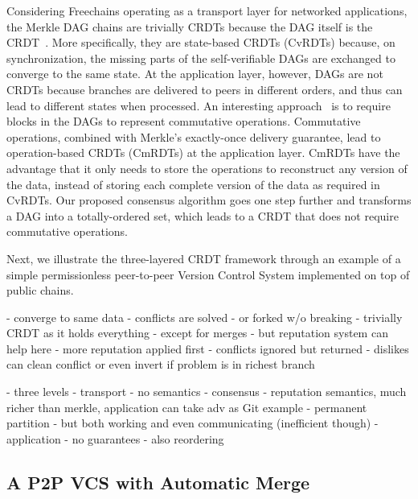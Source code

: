 \documentclass[10pt,journal,compsoc]{IEEEtran}
\newcommand{\FC}       {Freechains\xspace}
\begin{document}
Considering \FC operating as a transport layer for networked applications, the
Merkle DAG chains are trivially CRDTs because the DAG itself is the
CRDT~\cite{p2p.merkle-crdts}.
More specifically, they are state-based CRDTs (CvRDTs) because, on
synchronization, the missing parts of the self-verifiable DAGs are exchanged to
converge to the same state.
%
At the application layer, however, DAGs are not CRDTs because branches are
delivered to peers in different orders, and thus can lead to different states
when processed.
An interesting approach~\cite{p2p.merkle-crdts} is to require blocks in the
DAGs to represent commutative operations.
Commutative operations, combined with Merkle's exactly-once delivery guarantee,
lead to operation-based CRDTs (CmRDTs) at the application layer.
CmRDTs have the advantage that it only needs to store the operations to
reconstruct any version of the data, instead of storing each complete version
of the data as required in CvRDTs.
%
Our proposed consensus algorithm goes one step further and transforms a DAG
into a totally-ordered set, which leads to a CRDT that does not require
commutative operations.

Next, we illustrate the three-layered CRDT framework through an example of a
simple permissionless peer-to-peer Version Control System implemented on top
of public chains.

- converge to same data
    - conflicts are solved
    - or forked w/o breaking
- trivially CRDT as it holds everything
    - except for merges
- but reputation system can help here
    - more reputation applied first
        - conflicts ignored but returned
    - dislikes can clean conflict or even invert if problem is in richest branch

- three levels
    - transport
        - no semantics
    - consensus
        - reputation semantics, much richer than merkle, application can take adv as Git example
        - permanent partition
        - but both working and even communicating (inefficient though)
    - application
        - no guarantees
        - also reordering

\subsection{A P2P VCS with Automatic Merge}
\end{document}
